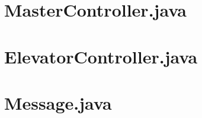 \appendix
\section{MasterController.java}


\section{ElevatorController.java}


\section{Message.java}
